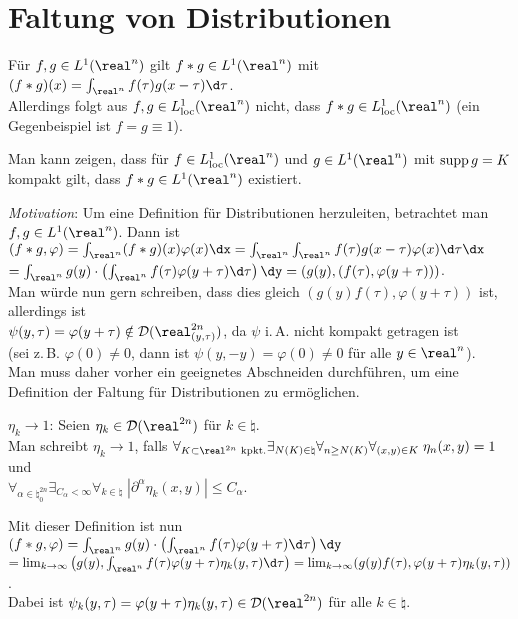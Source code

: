 \pagebreak

\section{%
    Faltung von Distributionen%
}

Für $f, g \in L^1(\real^n)$ gilt $f \ast g \in L^1(\real^n)$ mit
$(f \ast g)(x) = \int_{\real^n} f(\tau)g(x - \tau)\d\tau$.\\
Allerdings folgt aus $f, g \in L^1_\loc(\real^n)$ nicht, dass
$f \ast g \in L^1_\loc(\real^n)$
(ein Gegenbeispiel ist $f = g \equiv 1$).

Man kann zeigen, dass für $f \in L^1_\loc(\real^n)$ und $g \in L^1(\real^n)$
mit $\operatorname{supp} g = K$ kompakt gilt, dass $f \ast g \in L^1(\real^n)$ existiert.

\emph{Motivation}:
Um eine Definition für Distributionen herzuleiten, betrachtet man
$f, g \in L^1(\real^n)$.
Dann ist $(f \ast g, \varphi) = \int_{\real^n} (f \ast g)(x)\varphi(x)\dx =
\int_{\real^n} \int_{\real^n} f(\tau)g(x - \tau)\varphi(x)\d\tau \dx$\\
$= \int_{\real^n} g(y) \cdot
\left(\int_{\real^n} f(\tau)\varphi(y + \tau)\d\tau\right)\dy =
(g(y), (f(\tau), \varphi(y + \tau)))$.\\
Man würde nun gern schreiben, dass dies gleich
$(g(y) f(\tau), \varphi(y + \tau))$ ist, allerdings ist\\
$\psi(y, \tau) = \varphi(y + \tau) \notin \D(\real^{2n}_{(y,\tau)})$,
da $\psi$ i.\,A. nicht kompakt getragen ist\\
(sei z.\,B. $\varphi(0) \not= 0$, dann ist $\psi(y, -y) = \varphi(0) \not= 0$
für alle $y \in \real^n$).\\
Man muss daher vorher ein geeignetes Abschneiden durchführen, um
eine Definition der Faltung für Distributionen zu ermöglichen.

\textbf{$\eta_k \to 1$}:
Seien $\eta_k \in \D(\real^{2n})$ für $k \in \natural$.\\
Man schreibt $\eta_k \to 1$, falls
$\forall_{K \subset \real^{2n} \text{ kpkt.}} \exists_{N(K) \in \natural}
\forall_{n \ge N(K)} \forall_{(x, y) \in K}\; \eta_n(x, y) = 1$ und\\
$\forall_{\alpha \in \natural_0^{2n}} \exists_{C_\alpha < \infty}
\forall_{k \in \natural}\; |\partial^\alpha \eta_k(x, y)| \le C_\alpha$.

Mit dieser Definition ist nun
$(f \ast g, \varphi) = \int_{\real^n} g(y) \cdot
\left(\int_{\real^n} f(\tau)\varphi(y + \tau)\d\tau\right)\dy$\\
$= \lim_{k \to \infty} \left(g(y), \int_{\real^n}
f(\tau)\varphi(y + \tau)\eta_k(y, \tau)\d\tau\right) =
\lim_{k \to \infty} (g(y) f(\tau), \varphi(y + \tau)\eta_k(y, \tau))$.\\
Dabei ist
$\psi_k(y, \tau) = \varphi(y + \tau)\eta_k(y, \tau) \in \D(\real^{2n})$
für alle $k \in \natural$.

